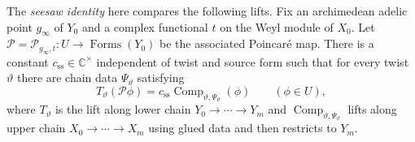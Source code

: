\begin{theorem}
\label{thm:a-seesaw}
\emitthmsource
The \emph{seesaw identity} here compares the following lifts. Fix an archimedean adelic point $g_\infty$ of $Y_0$ and a complex functional $t$ on the Weyl module of $X_0$. Let $\mathcal P=\mathcal P_{g_\infty,t}\colon U\to\operatorname{Forms}(Y_0)$ be the associated Poincaré map. There is a constant $c_{\mathrm{ss}}\in\mathbb C^\times$ independent of twist and source form such that for every twist $\vartheta$ there are chain data $\Psi_\vartheta$ satisfying
\begin{equation}
 T_\vartheta(\mathcal P\phi)
   =c_{\mathrm{ss}}\operatorname{Comp}_{\vartheta,\Psi_\vartheta}(\phi)
 \qquad(\phi\in U),
\label{eq:a-seesaw}
\end{equation}
where $T_\vartheta$ is the lift along lower chain $Y_0\to\cdots\to Y_m$ and $\operatorname{Comp}_{\vartheta,\Psi_\vartheta}$ lifts along upper chain $X_0\to\cdots\to X_m$ using glued data and then restricts to $Y_m$.
\end{theorem}
